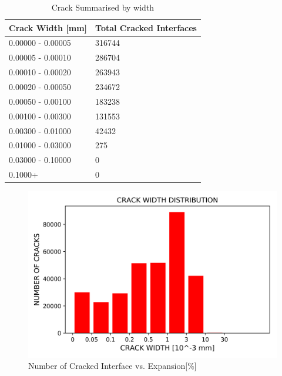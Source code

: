 \begin{table}[!h]
  \caption{Crack Summarised by width}
\centering
\begin{tabular}{ |p{4cm}|p{5cm}| }
\hline
 Crack Width [mm] &  Total Cracked Interfaces \\
 \hline\hline

   0.00000 - 0.00005 & 316744 \\
   0.00005 - 0.00010 & 286704 \\
   0.00010 - 0.00020 & 263943 \\
   0.00020 - 0.00050 & 234672 \\
   0.00050 - 0.00100 & 183238 \\
   0.00100 - 0.00300 & 131553 \\
   0.00300 - 0.01000 & 42432 \\
   0.01000 - 0.03000 & 275 \\
   0.03000 - 0.10000 & 0 \\
   0.1000+ & 0 \\

  \hline
  \end{tabular}

\label{table:A30P75_3_Crackls}
\end{table}

\begin{figure}[ht!]
\centering
\includegraphics[width=.8\linewidth]{Files/interface/A30P75_3.png}
  \caption{Number of Cracked Interface vs. Expansion[\%]}
  \label{A30P75CR_3}
\end{figure}
